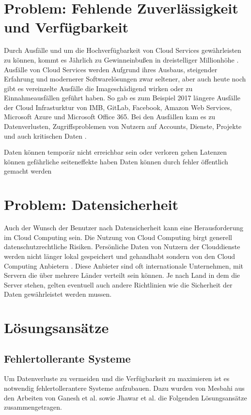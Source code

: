 \section{Problem: Fehlende Zuverlässigkeit und Verfügbarkeit}
\label{sec:fehlende-Sicherheit}
Durch Ausfälle und um die Hochverfügbarkeit von Cloud Services gewährleisten zu können, 
kommt es Jährlich zu Gewinneinbußen in dreistelliger Millionhöhe \cite{snyder2015 }.
Ausfälle von Cloud Services werden Aufgrund ihres Ausbaus, 
steigender Erfahrung und modernerer Softwarelösungen zwar seltener, 
aber auch heute noch gibt es vereinzelte Ausfälle die Imageschädigend wirken oder zu Einnahmeausfällen geführt haben. 
So gab es zum Beispiel 2017 längere Ausfälle der Cloud Infrasturktur von 
IMB, GitLab, Facebook, Amazon Web Services, Microsoft Azure und Microsoft Office 365. 
Bei den Ausfällen kam es zu Datenverlusten, Zugriffsproblemen von Nutzern auf Accounts, 
Dienste, Projekte und auch kritischen Daten \cite{tsidulko2017}.


Daten können temporär nicht erreichbar sein oder verloren gehen
Latenzen können gefährliche seiteneffekte haben
Daten können durch fehler öffentlich gemacht werden

\section{Problem: Datensicherheit}
Auch der Wunsch der Benutzer nach Datensicherheit kann eine Herausforderung im Cloud Computing sein. Die Nutzung von Cloud Computing birgt generell datenschutzrechtliche Risiken. 
Persönliche Daten von Nutzern der Clouddienste werden nicht länger lokal gespeichert und gehandhabt sondern von den Cloud Computing Anbietern \cite{selzer2020}. 
Diese Anbieter sind oft internationale Unternehmen, mit Servern die über mehrere Länder verteilt sein können. Je nach Land in dem die Server stehen, gelten eventuell auch andere Richtlinien wie die Sicherheit der Daten gewährleistet werden mussen.




\section{Lösungsansätze}

\subsection{Fehlertollerante Systeme}
Um Datenverluste zu vermeiden und die Verfügbarkeit zu maximieren ist es notwendig fehlertollerantere Systeme aufzubauen. Dazu wurden von Mesbahi \cite{mesbahi2018} aus den Arbeiten von Ganesh et al. \cite{ganesh2014} sowie Jhawar et al. \cite{jhawar2013}die Folgenden Lösungsansätze zusammengetragen.

